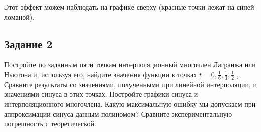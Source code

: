 \documentclass[11pt]{article}
\begin{document}
Этот эффект можем наблюдать на графике сверху (красные точки лежат на
синей ломаной).

    \hypertarget{ux437ux430ux434ux430ux43dux438ux435-2}{%
\subsection{Задание 2}\label{ux437ux430ux434ux430ux43dux438ux435-2}}

Постройте по заданным пяти точкам интерполяционный многочлен Лагранжа
или Ньютона и, используя его, найдите значения функции в точках
\(t = {0}, \frac{1}{6} , \frac{1}{3} , \frac{1}{2}\) , Сравните
результаты со значениями, полученными при линейной интерполяции, и
значениями синуса в этих точках. Постройте графики синуса и
интерполяционного многочлена. Какую максимальную ошибку мы допускаем при
аппроксимации синуса данным полиномом? Сравните экспериментальную
погрешность с теоретической.
\end{document}
